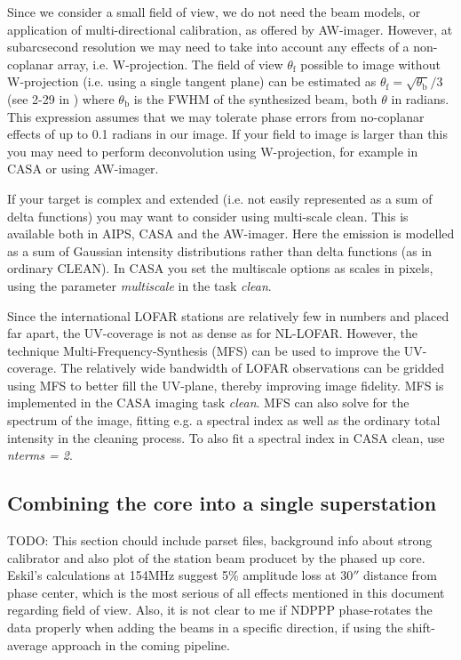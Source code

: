 Since we consider a small field of view, we do
not need the beam models, or application of multi-directional calibration, as
offered by AW-imager. However, at subarcsecond
resolution we may need to take into account any effects of a non-coplanar
array, i.e. W-projection. The field of view $\theta_\mathrm{f}$ possible to
image without W-projection (i.e. using a single tangent plane) can be estimated
as $\theta_{\mathrm{f}} = \sqrt{\theta_{\mathrm{b}}}/3$ (see 2-29 in
\cite{NRAO}) where $\theta_\mathrm{b}$ is the FWHM of the synthesized beam,
both $\theta$ in radians. This expression assumes that we may tolerate phase errors
from no-coplanar effects of up to 0.1 radians in our image.
If your field to image is larger than this you may need to
perform deconvolution using W-projection, for example in CASA or using AW-imager.

If your target is complex and extended (i.e. not easily represented as a sum of
delta functions) you may want to consider using multi-scale clean. This is
available both in AIPS, CASA and the AW-imager. Here the emission is modelled
as a sum of Gaussian intensity distributions rather than delta functions (as in
ordinary CLEAN). In CASA you set the multiscale options as scales in pixels,
using the parameter \emph{multiscale} in the task \emph{clean}. 

Since the international LOFAR stations are relatively few in numbers and placed
far apart, the UV-coverage is not as dense as for NL-LOFAR. However, the
technique Multi-Frequency-Synthesis (MFS) can be used to improve the
UV-coverage. The relatively wide bandwidth of LOFAR observations can be gridded
using MFS to better fill the UV-plane, thereby improving image fidelity. MFS is
implemented in the CASA imaging task \emph{clean}. MFS can also solve for the 
spectrum of the image, fitting e.g. a spectral index as well as the ordinary
total intensity in the cleaning process. To also fit a spectral index
in CASA clean, use \emph{nterms = 2}.

\subsection{Combining the core into a single superstation}
\label{sect:phaseup}
TODO: This section chould include parset files, background info about strong
calibrator and also plot of the station beam producet by the phased up core.
Eskil's calculations at 154MHz suggest 5\% amplitude loss at 30$''$ distance
from phase center, which is the most serious of all effects mentioned in this
document regarding field of view. Also, it is not clear to me if NDPPP
phase-rotates the data properly when adding the beams in a specific direction,
if using the shift-average approach in the coming pipeline.

